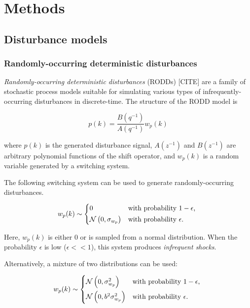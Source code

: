 \chapter{Methods}
\label{chap-methods}

\section{Disturbance models}

\subsection{Randomly-occurring deterministic disturbances}\label{subsec-RODD}

\textit{Randomly-occurring deterministic disturbances} (RODDs) [CITE] are a family of stochastic process models suitable for simulating various types of infrequently-occurring disturbances in discrete-time.  The structure of the RODD model is

\begin{equation} \label{eq:RODD}
	p(k)= \frac{B(q^{-1})}{A(q^{-1})}w_p(k)
\end{equation}

where $p(k)$ is the generated disturbance signal, $A(z^{-1})$ and $B(z^{-1})$ are arbitrary polynomial functions of the shift operator, and $w_p(k)$ is a random variable generated by a switching system.

The following switching system can be used to generate randomly-occurring disturbances.

\begin{equation} \label{eq:alpha1}
w_p(k) \sim 
\begin{cases*}
	0 & with probability $1-\epsilon$, \\
	\mathcal{N}\left(0, \sigma_{w_p}\right) & with probability $\epsilon$.
\end{cases*}
\end{equation}

Here, $w_p(k)$ is either 0 or is sampled from a normal distribution.  When the probability $\epsilon$ is low ($\epsilon<<1$), this system produces \textit{infrequent shocks}.

Alternatively, a mixture of two distributions can be used:

\begin{equation} \label{eq:alpha2}
w_p(k) \sim 
	\begin{cases*}
		\mathcal{N}\left(0, \sigma_{w_p}^2\right) & with probability $1-\epsilon$, \\
		\mathcal{N}\left(0, b^2\sigma_{w_p}^2\right) & with probability $\epsilon$.
	\end{cases*}
\end{equation}

